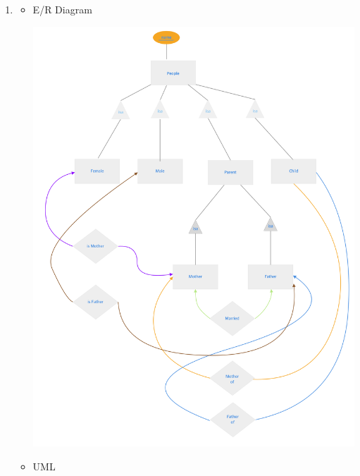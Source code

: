 \documentclass[12pt]{article}
\begin{document}
\begin{enumerate}[1.]
    \item

    \begin{itemize}
        \item E/R Diagram

        \begin{center}
        \includegraphics[width=\linewidth]{images/worksheet_15_solution_17.png}
        \end{center}

        \item UML


\end{itemize}
\end{enumerate}
\end{document}
